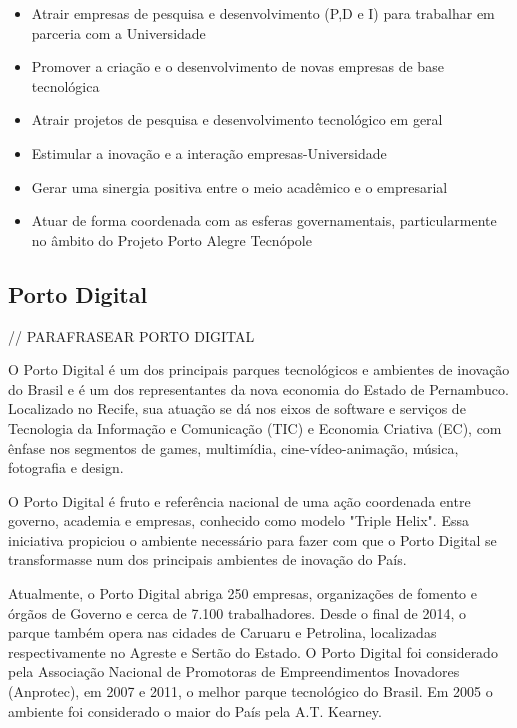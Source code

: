 \begin{itemize}
\item Atrair empresas de pesquisa e desenvolvimento (P,D e I) para trabalhar em parceria com a Universidade
\item Promover a criação e o desenvolvimento de novas empresas de base tecnológica
\item Atrair projetos de pesquisa e desenvolvimento tecnológico em geral
\item Estimular a inovação e a interação empresas-Universidade
\item Gerar uma sinergia positiva entre o meio acadêmico e o empresarial
\item Atuar de forma coordenada com as esferas governamentais, particularmente no âmbito do Projeto Porto Alegre Tecnópole
\end{itemize}

\subsection{Porto Digital}

// PARAFRASEAR PORTO DIGITAL

O Porto Digital é um dos principais parques tecnológicos e ambientes de inovação do Brasil e é um dos representantes da nova economia do Estado de Pernambuco. Localizado no Recife, sua atuação se dá nos eixos de software e serviços de Tecnologia da Informação e Comunicação (TIC) e Economia Criativa (EC), com ênfase nos segmentos de games, multimídia, cine-vídeo-animação, música, fotografia e design.

O Porto Digital é fruto e referência nacional de uma ação coordenada entre governo, academia e empresas, conhecido como modelo "Triple Helix". Essa iniciativa propiciou o ambiente necessário para fazer com que o Porto Digital se transformasse num dos principais ambientes de inovação do País. 

Atualmente, o Porto Digital abriga 250 empresas, organizações de fomento e órgãos de Governo e cerca de 7.100 trabalhadores. Desde o final de 2014, o parque também opera nas cidades de Caruaru e Petrolina, localizadas respectivamente no Agreste e Sertão do Estado. O Porto Digital foi considerado pela Associação Nacional de Promotoras de Empreendimentos Inovadores (Anprotec), em 2007 e 2011, o melhor parque tecnológico do Brasil. Em 2005 o ambiente foi considerado o maior do País pela A.T. Kearney.


